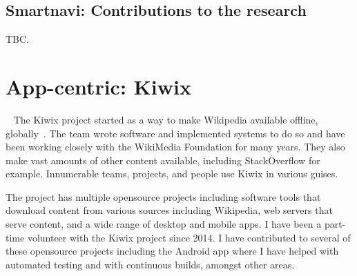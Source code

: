 \subsection{Smartnavi: Contributions to the research}
TBC.



\clearpage


\section{App-centric: Kiwix}~\label{case-study-overview-kiwix}
The Kiwix project started as a way to make Wikipedia available offline, globally~. The team wrote software and implemented systems to do so and have been working closely with the WikiMedia Foundation for many years. They also make vast amounts of other content available, including StackOverflow for example. Innumerable teams, projects, and people use Kiwix in various guises.

The project has multiple opensource projects including software tools that download content from various sources including Wikipedia, web servers that serve content, and a wide range of desktop and mobile apps. I have been a part-time volunteer with the Kiwix project since 2014. I have contributed to several of these opensource projects including the Android app where I have helped with automated testing and with continuous builds, amongst other areas.

